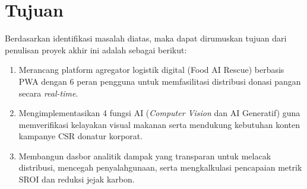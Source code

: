 \section{Tujuan}
Berdasarkan identifikasi masalah diatas, maka dapat dirumuskan tujuan dari penulisan proyek akhir ini adalah sebagai berikut:
\begin{enumerate}
    \item Merancang platform agregator logistik digital (Food AI Rescue) berbasis PWA dengan 6 peran pengguna untuk memfasilitasi distribusi donasi pangan secara \textit{real-time}.
    \item Mengimplementasikan 4 fungsi AI (\textit{Computer Vision} dan AI Generatif) guna memverifikasi kelayakan visual makanan serta mendukung kebutuhan konten kampanye CSR donatur korporat.
    \item Membangun dasbor analitik dampak yang transparan untuk melacak distribusi, mencegah penyalahgunaan, serta mengkalkulasi pencapaian metrik SROI dan reduksi jejak karbon.
\end{enumerate}


